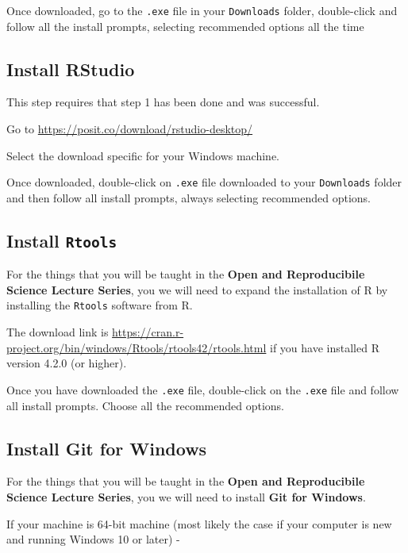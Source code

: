 \documentclass[
  12pt,
]{book}
\begin{document}
Once downloaded, go to the \texttt{.exe} file in your \texttt{Downloads} folder, double-click and follow all the install prompts, selecting recommended options all the time

\hypertarget{install-rstudio}{%
\subsection{Install RStudio}\label{install-rstudio}}

This step requires that step 1 has been done and was successful.

Go to \url{https://posit.co/download/rstudio-desktop/}

Select the download specific for your Windows machine.

Once downloaded, double-click on \texttt{.exe} file downloaded to your \texttt{Downloads} folder and then follow all install prompts, always selecting recommended options.

\hypertarget{install-rtools}{%
\subsection{\texorpdfstring{Install \texttt{Rtools}}{Install Rtools}}\label{install-rtools}}

For the things that you will be taught in the \textbf{Open and Reproducibile Science Lecture Series}, you we will need to expand the installation of R by installing the \texttt{Rtools} software from R.

The download link is \url{https://cran.r-project.org/bin/windows/Rtools/rtools42/rtools.html} if you have installed R version 4.2.0 (or higher).

Once you have downloaded the \texttt{.exe} file, double-click on the \texttt{.exe} file and follow all install prompts. Choose all the recommended options.

\hypertarget{install-git-for-windows}{%
\subsection{Install Git for Windows}\label{install-git-for-windows}}

For the things that you will be taught in the \textbf{Open and Reproducibile Science Lecture Series}, you we will need to install \textbf{Git for Windows}.

If your machine is 64-bit machine (most likely the case if your computer is new and running Windows 10 or later) -
\end{document}
